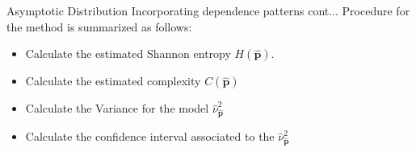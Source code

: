 \documentclass{beamer}
\begin{document}

\begin{frame}{Asymptotic Distribution Incorporating dependence patterns cont...}
Procedure for the method is summarized as follows:

	\begin{itemize}
		\item Calculate the estimated Shannon entropy $H(\widehat{\mathbf{p}})$.
		\item Calculate the estimated complexity $C(\widehat{\bm{p}})$ 
		\item Calculate the Variance for the model $\widehat{\nu}^2_{\widehat{\mathbf{p}}}$  
		\item Calculate the confidence interval associated to the $\widehat{\nu}^2_{\widehat{\mathbf{p}}}$  
	\end{itemize}
\end{frame}


	
\end{document}
